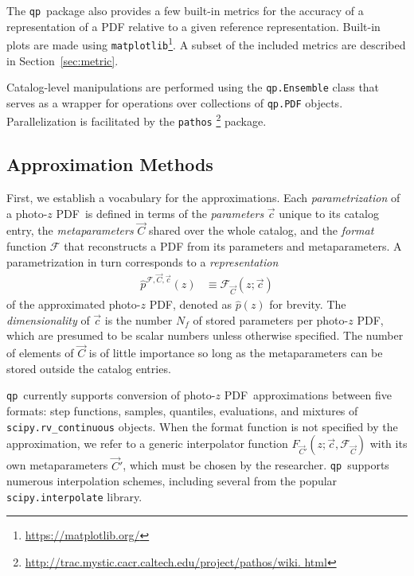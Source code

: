 \documentclass[\docopts]{\docclass}
\newcommand{\qp}{\texttt{qp}}
\newcommand{\pz}{photo-$z$ PDF}
\begin{document}
The \qp\ package also provides a few built-in metrics for the accuracy of a 
representation of a PDF relative to a given reference representation.
Built-in plots are made using 
\texttt{matplotlib}\footnote{\url{https://matplotlib.org/}}.
A subset of the included metrics are described in Section~\ref{sec:metric}.

Catalog-level manipulations are performed using the \texttt{qp.Ensemble} class 
that serves as a wrapper for operations over collections of \texttt{qp.PDF} 
objects.
Parallelization is facilitated by the \texttt{pathos} 
\footnote{\noindent\url{http://trac.mystic.cacr.caltech.edu/project/pathos/wiki.
html}} \citep{mckerns_building_2012, mckerns_pathos:_2010} package.

\subsection{Approximation Methods}
\label{sec:approx}

First, we establish a vocabulary for the approximations.
Each \textit{parametrization} of a \pz\ is defined in terms of the 
\textit{parameters} $\vec{c}$ unique to its catalog entry, the 
\textit{metaparameters} $\vec{C}$ shared over the whole catalog, and the 
\textit{format} function $\mathcal{F}$ that reconstructs a PDF from its 
parameters and metaparameters.
A parametrization in turn corresponds to a \textit{representation}
\begin{align}
  \label{eq:definition}
  \hat{p}^{\mathcal{F}, \vec{C}, \vec{c}}(z) &\equiv \mathcal{F}_{\vec{C}}(z; 
\vec{c})
\end{align}
of the approximated \pz, denoted as $\hat{p}(z)$ for brevity.
The \textit{dimensionality} of $\vec{c}$ is the number $N_{f}$ of stored 
parameters per \pz, which are presumed to be scalar numbers unless otherwise 
specified.
The number of elements of $\vec{C}$ is of little importance so long as the 
metaparameters can be stored outside the catalog entries.

\qp\ currently supports conversion of \pz\ approximations between five formats: 
step functions, samples, quantiles, evaluations, and mixtures of 
\texttt{scipy.rv\_continuous} objects.
When the format function is not specified by the approximation, we refer to a 
generic interpolator function $F_{\vec{C}'}(z; \vec{c}, \mathcal{F}_{\vec{C}})$ 
with its own metaparameters $\vec{C}'$, which must be chosen by the researcher.
\qp\ supports numerous interpolation schemes, including several from the 
popular \texttt{scipy.interpolate} library.
\end{document}
